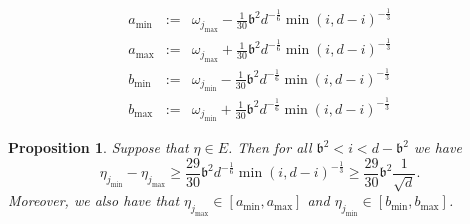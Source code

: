 \documentclass[11pt,letterpaper]{article}
\newtheorem{proposition}[theorem]{Proposition}
\begin{document}
\begin{eqnarray}\label{eq_n26}
    a_{\mathrm{min}}&:= &\omega_{j_{\mathrm{max}}} - \frac{1}{30} \mathfrak{b}^2 d^{-\frac{1}{6}} \min(i, d-i)^{-\frac{1}{3}}\nonumber\\
a_{\mathrm{max}}&:=& \omega_{j_{\mathrm{max}}} + \frac{1}{30} \mathfrak{b}^2 d^{-\frac{1}{6}} \min(i, d-i)^{-\frac{1}{3}}\nonumber\\
%
b_{\mathrm{min}}&:= & \omega_{j_{\mathrm{min}}} - \frac{1}{30} \mathfrak{b}^2 d^{-\frac{1}{6}} \min(i, d-i)^{-\frac{1}{3}}\nonumber\\
%
b_{\mathrm{max}}&:=& \omega_{j_{\mathrm{min}}} + \frac{1}{30} \mathfrak{b}^2 d^{-\frac{1}{6}} \min(i, d-i)^{-\frac{1}{3}}
\end{eqnarray}


\begin{proposition}\label{prop_n1}
Suppose that $\eta \in E$. 
%
Then for all $\mathfrak{b}^2 < i < d-\mathfrak{b}^2$ we have
%
\begin{equation}\label{eq_c2}
    \eta_{j_{\mathrm{min}}} - \eta_{j_{\mathrm{max}}} \geq    \frac{29}{30} \mathfrak{b}^2 d^{-\frac{1}{6}} \min(i, d-i)^{-\frac{1}{3}} \geq  \frac{29}{30} \mathfrak{b}^2 \frac{1}{\sqrt{d}}.
\end{equation}
%
Moreover, we also have that 
%
$ \eta_{j_{\mathrm{max}}}  \in[a_{\mathrm{min}}, a_{\mathrm{max}}]$ and  $ \eta_{j_{\mathrm{min}}}  \in[b_{\mathrm{min}}, b_{\mathrm{max}}]$.

\end{proposition}
%
\end{document}
